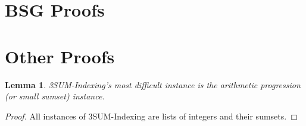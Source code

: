 \documentclass{article}
\newtheorem{lemma}{Lemma}
\begin{document}
\section{BSG Proofs}
\label{sec:bsg}

\section{Other Proofs}
\label{sec:other}

\begin{lemma}
\label{Difficulty of 3SUM-Indexing}
3SUM-Indexing's most difficult instance is the arithmetic progression (or small sumset) instance.
\end{lemma}

\begin{proof}
All instances of 3SUM-Indexing are lists of integers and their sumsets.
\end{proof}
\end{document}
